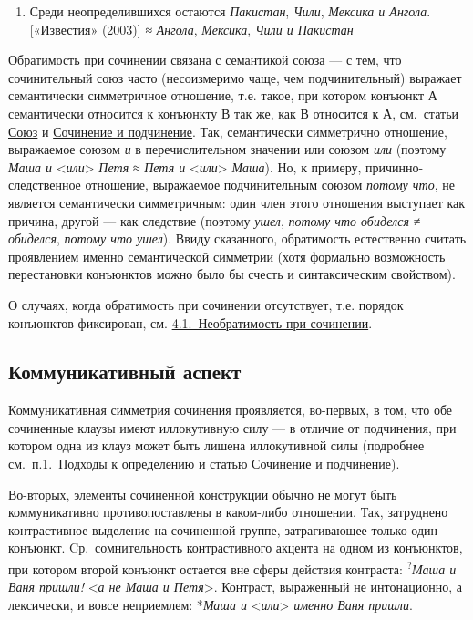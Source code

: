 \begin{enumerate}
  \def\labelenumi{(\arabic{enumi})}
  \setcounter{enumi}{23}
  \item
        Среди неопределившихся остаются \textit{Пакистан}, \textit{Чили},
        \textit{Мексика и Ангола}. {[}«Известия» (2003){]} ≈ \textit{Ангола},
        \textit{Мексика}, \textit{Чили и Пакистан}
\end{enumerate}

Обратимость при сочинении связана с семантикой союза --- с тем, что
сочинительный союз часто (несоизмеримо чаще, чем подчинительный)
выражает семантически симметричное отношение, т.е. такое, при котором
конъюнкт А семантически относится к конъюнкту В так же, как В относится
к А, см.~статьи \underline{Союз} и \underline{Сочинение и подчинение}.
Так, семантически симметрично отношение, выражаемое союзом \textit{и} в
перечислительном значении или союзом \textit{или} (поэтому \textit{Маша и}
\textless{}\textit{или}\textgreater{} \textit{Петя} ≈ \textit{Петя и}
\textless{}\textit{или}\textgreater{} \textit{Маша}). Но, к примеру,
причинно-следственное отношение, выражаемое подчинительным союзом
\textit{потому что}, не является семантически симметричным: один член
этого отношения выступает как причина, другой --- как следствие (поэтому
\textit{ушел}, \textit{потому что обиделся} ≠ \textit{обиделся}, \textit{потому
  что ушел}). Ввиду сказанного, обратимость естественно считать
проявлением именно семантической симметрии (хотя формально возможность
перестановки конъюнктов можно было бы счесть и синтаксическим
свойством).

О случаях, когда обратимость при сочинении отсутствует, т.е. порядок
конъюнктов фиксирован, см. \underline{4.1.~Необратимость при сочинении}.

\subsection{Коммуникативный
  аспект}\label{ux43aux43eux43cux43cux443ux43dux438ux43aux430ux442ux438ux432ux43dux44bux439-ux430ux441ux43fux435ux43aux442}

Коммуникативная симметрия сочинения проявляется, во-первых, в том, что
обе сочиненные клаузы имеют иллокутивную силу --- в отличие от
подчинения, при котором одна из клауз может быть лишена иллокутивной
силы (подробнее см.~\underline{п.1.~Подходы к определению} и статью
\underline{Сочинение и подчинение}).

Во-вторых, элементы сочиненной конструкции обычно не могут быть
коммуникативно противопоставлены в каком-либо отношении. Так, затруднено
контрастивное выделение на сочиненной группе, затрагивающее только один
конъюнкт. Cр.~сомнительность контрастивного акцента на одном из
конъюнктов, при котором второй конъюнкт остается вне сферы действия
контраста: \textsuperscript{?}\textit{Маша и Ваня пришли!}
\textless{}\textit{а не Маша и Петя}\textgreater. Контраст, выраженный не
интонационно, а лексически, и вовсе неприемлем: *\textit{Маша и}
\textless{}\textit{или}\textgreater{} \textit{именно Ваня пришли}.

